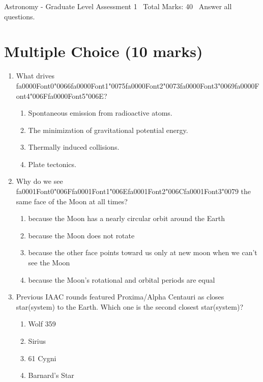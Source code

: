 \documentclass[12pt]{article}
\begin{document}
\begin{center}
Astronomy - Graduate Level Assessment 1 \
Total Marks: 40 \
Answer all questions.
\end{center}

\section*{Multiple Choice (10 marks)}
\begin{enumerate}[label=\arabic*.]
\item What drives {\csname fa0000Font0\endcsname\char"0066}{\csname fa0000Font1\endcsname\char"0075}{\csname fa0000Font2\endcsname\char"0073}{\csname fa0000Font3\endcsname\char"0069}{\csname fa0000Font4\endcsname\char"006F}{\csname fa0000Font5\endcsname\char"006E}?
\begin{enumerate}[label=(\alph*)]
    \item Spontaneous emission from radioactive atoms.
    \item The minimization of gravitational potential energy.
    \item Thermally induced collisions.
    \item Plate tectonics.
\end{enumerate}
\item Why do we see {\csname fa0001Font0\endcsname\char"006F}{\csname fa0001Font1\endcsname\char"006E}{\csname fa0001Font2\endcsname\char"006C}{\csname fa0001Font3\endcsname\char"0079} the same face of the Moon at all times?
\begin{enumerate}[label=(\alph*)]
    \item because the Moon has a nearly circular orbit around the Earth
    \item because the Moon does not rotate
    \item because the other face points toward us only at new moon when we can't see the Moon
    \item because the Moon's rotational and orbital periods are equal
\end{enumerate}
\item Previous IAAC rounds featured Proxima/Alpha Centauri as closes star(system) to the Earth.
Which one is the second closest star(system)?
\begin{enumerate}[label=(\alph*)]
    \item Wolf 359
    \item Sirius
    \item 61 Cygni
    \item Barnard's Star

\end{enumerate}
\end{enumerate}
\end{document}
